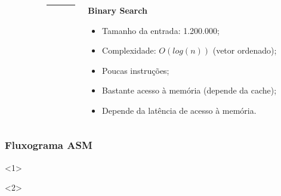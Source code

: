 \documentclass{beamer}
\begin{document}
\begin{frame}
\begin{columns}
\begin{column}{0.30\textwidth}
            \end{column}

            \begin{column}{0.02\textwidth}
                \rule{.1mm}{0.75\textheight}
            \end{column}

            \begin{column}{0.35\textwidth}
                \footnotesize

                \begin{center}
                    \textbf{Binary Search}
                \end{center}

                \begin{itemize}
                    \item Tamanho da entrada: 1.200.000;
                    \item Complexidade: $O(log(n))$ (vetor ordenado);
                    \item Poucas instruções;
                    \item Bastante acesso à memória (depende da cache);
                    \item Depende da latência de acesso à memória.
                \end{itemize}

            \end{column}
        \end{columns}
    \end{frame}

    \begin{frame}
        \frametitle{Fluxograma ASM}

        \begin{onlyenv}<1>
            \begin{figure}[h]
                \centering
            \end{figure}
        \end{onlyenv}

        \begin{onlyenv}<2>
          \begin{figure}[h]
            \centering
          \end{figure}
        \end{onlyenv}
    \end{frame}
\end{document}
